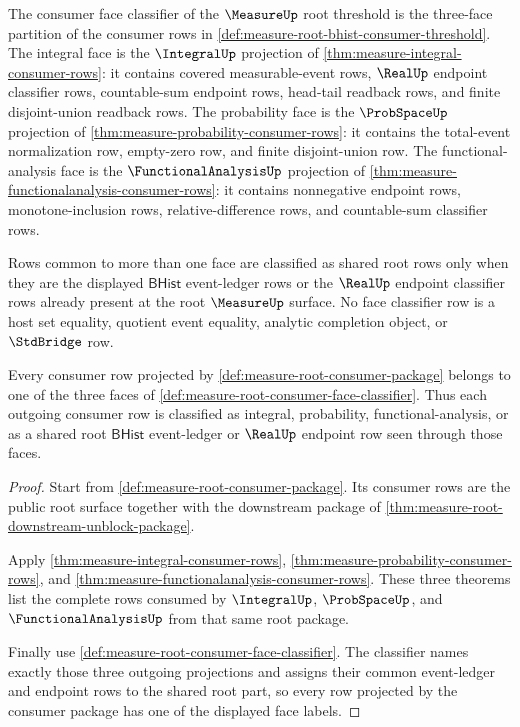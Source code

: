 \begin{definition}
\label{def:measure-root-consumer-face-classifier}
The consumer face classifier of the $\MeasureUp$ root threshold is the
three-face partition of the consumer rows in
\autoref{def:measure-root-bhist-consumer-threshold}. The integral face is the
$\IntegralUp$ projection of \autoref{thm:measure-integral-consumer-rows}: it
contains covered measurable-event rows, $\RealUp$ endpoint classifier rows,
countable-sum endpoint rows, head-tail readback rows, and finite
disjoint-union readback rows. The probability face is the $\ProbSpaceUp$
projection of \autoref{thm:measure-probability-consumer-rows}: it contains
the total-event normalization row, empty-zero row, and finite
disjoint-union row. The functional-analysis face is the
$\FunctionalAnalysisUp$ projection of
\autoref{thm:measure-functionalanalysis-consumer-rows}: it contains
nonnegative endpoint rows, monotone-inclusion rows, relative-difference rows,
and countable-sum classifier rows.

Rows common to more than one face are classified as shared root rows only
when they are the displayed $\mathsf{BHist}$ event-ledger rows or the
$\RealUp$ endpoint classifier rows already present at the root
$\MeasureUp$ surface. No face classifier row is a host set equality,
quotient event equality, analytic completion object, or $\StdBridge$ row.
\end{definition}

\begin{theorem}
\label{thm:measure-root-consumer-face-coverage}
Every consumer row projected by
\autoref{def:measure-root-consumer-package} belongs to one of the three faces
of \autoref{def:measure-root-consumer-face-classifier}. Thus each outgoing
consumer row is classified as integral, probability, functional-analysis, or
as a shared root $\mathsf{BHist}$ event-ledger or $\RealUp$ endpoint row
seen through those faces.
\end{theorem}
\begin{proof}
Start from \autoref{def:measure-root-consumer-package}. Its consumer rows are
the public root surface together with the downstream package of
\autoref{thm:measure-root-downstream-unblock-package}.

Apply \autoref{thm:measure-integral-consumer-rows},
\autoref{thm:measure-probability-consumer-rows}, and
\autoref{thm:measure-functionalanalysis-consumer-rows}. These three theorems
list the complete rows consumed by $\IntegralUp$, $\ProbSpaceUp$, and
$\FunctionalAnalysisUp$ from that same root package.

Finally use \autoref{def:measure-root-consumer-face-classifier}. The
classifier names exactly those three outgoing projections and assigns their
common event-ledger and endpoint rows to the shared root part, so every row
projected by the consumer package has one of the displayed face labels.
\end{proof}

